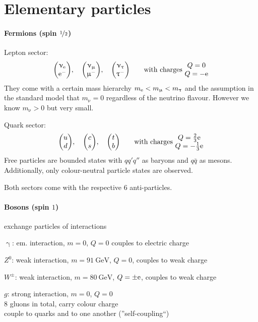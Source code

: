 \section{Elementary particles}
\paragraph{Fermions (spin $\nicefrac 12$)} Lepton sector:
\begin{align}
    \mqty(\upnu_\mr{e} \\\mr e^- ), \quad \mqty(\upnu_\upmu \\ \upmu^-),\quad \mqty(\upnu_\uptau \\ \uptau^-) \qquad \text{with charges } \mqty{Q = 0 \\ Q= -\mr e}
\end{align}
They come with a certain mass hierarchy $m_{\mathrm{e}} < m_\upmu < m_\uptau$ and the assumption in the standard model that $m_\upnu = 0$ regardless of the neutrino flavour. However we know $m_\upnu >0$ but very small.

Quark sector:
\begin{align}
    \mqty(u \\ d), \quad \mqty(c \\ s), \quad \mqty( t \\ b) \qquad \text{with charges } \mqty{Q = \frac 23 \mr e \\ Q = - \frac 13 \mr e}
\end{align}
Free particles are bounded states with $qq'q''$ as baryons and $q\bar q$ as mesons. Additionally, only colour-neutral particle states are observed.

Both sectors come with the respective 6 anti-particles.

\paragraph{Bosons (spin $1$)} exchange particles of interactions
\begin{compactitem}
    \item[$\upgamma$:] em. interaction, $m=0$, $Q=0$ couples to electric charge
    \item[$Z^0$:] weak interaction, $m = \SI{91}{\giga\eV}$, $Q=0$, couples to weak charge
    \item[$W^\pm$:] weak interaction, $m = \SI{80}{\giga\eV}$, $Q = \pm \mathrm{e}$, couples to weak charge
    \item[$g$:] strong interaction, $m=0$, $Q=0$\\
    8 gluons in total, carry colour charge\\
    couple to quarks and to one another (''self-coupling``)
\end{compactitem}

